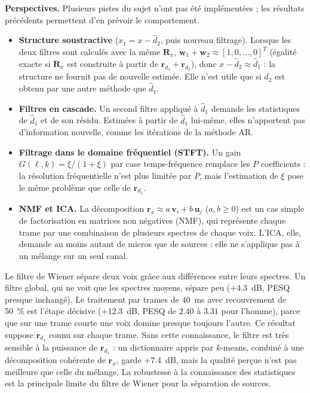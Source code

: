 \textbf{Perspectives.} Plusieurs pistes du sujet n'ont pas été implémentées ; les résultats précédents permettent d'en prévoir le comportement.
\begin{itemize}
  \item \textbf{Structure soustractive} ($x_1=x-\hat d_2$, puis nouveau filtrage). Lorsque les deux filtres sont calculés avec la même $\mathbf{R}_x$, $\mathbf{w}_1+\mathbf{w}_2\approx[1,0,\dots,0]^T$ (égalité exacte si $\mathbf{R}_x$ est construite à partir de $\mathbf{r}_{d_1}+\mathbf{r}_{d_2}$), donc $x-\hat d_2\approx\hat d_1$ : la structure ne fournit pas de nouvelle estimée. Elle n'est utile que si $\hat d_2$ est obtenu par une autre méthode que $\hat d_1$.
  \item \textbf{Filtres en cascade.} Un second filtre appliqué à $\hat d_1$ demande les statistiques de $\hat d_1$ et de son résidu. Estimées à partir de $\hat d_1$ lui-même, elles n'apportent pas d'information nouvelle, comme les itérations de la méthode AR.
  \item \textbf{Filtrage dans le domaine fréquentiel (STFT).} Un gain $G(\ell,k)=\xi/(1+\xi)$ par case temps-fréquence remplace les $P$ coefficients : la résolution fréquentielle n'est plus limitée par $P$, mais l'estimation de $\xi$ pose le même problème que celle de $\mathbf{r}_{d_1}$.
  \item \textbf{NMF et ICA.} La décomposition $\mathbf{r}_x\approx a\,\mathbf{v}_i+b\,\mathbf{u}_j$ ($a,b\geq 0$) est un cas simple de factorisation en matrices non négatives (NMF), qui représente chaque trame par une combinaison de plusieurs spectres de chaque voix. L'ICA, elle, demande au moins autant de micros que de sources : elle ne s'applique pas à un mélange sur un seul canal.
\end{itemize}

\begin{resultat}
Le filtre de Wiener sépare deux voix grâce aux différences entre leurs spectres. Un filtre global, qui ne voit que les spectres moyens, sépare peu ($+4.3$~dB, PESQ presque inchangé). Le traitement par trames de $40$~ms avec recouvrement de 50~\% est l'étape décisive ($+12.3$~dB, PESQ de $2.40$ à $3.31$ pour l'homme), parce que sur une trame courte une voix domine presque toujours l'autre. Ce résultat suppose $\mathbf{r}_{d_1}$ connu sur chaque trame. Sans cette connaissance, le filtre est très sensible à la puissance de $\mathbf{r}_{d_1}$ : un dictionnaire appris par $k$-means, combiné à une décomposition cohérente de $\mathbf{r}_x$, garde $+7.4$~dB, mais la qualité perçue n'est pas meilleure que celle du mélange. La robustesse à la connaissance des statistiques est la principale limite du filtre de Wiener pour la séparation de sources.
\end{resultat}
